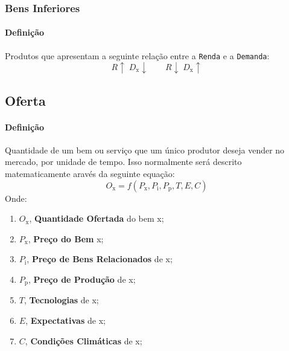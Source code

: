 \documentclass{article}
\begin{document}
        \subsubsection{Bens Inferiores}
            \paragraph{Definição}Produtos que apresentam a seguinte relação entre a \texttt{Renda} e a \texttt{Demanda}:
                \begin{equation}
                    \boxed{
                        R\uparrow
                        \;
                        D_{\text{x}}\downarrow
                    }
                    \qquad
                    \boxed{
                        R\downarrow
                        \;
                        D_{\text{x}}\uparrow
                    }
                \end{equation}

        \subsection{Oferta}
            \paragraph{Definição}Quantidade de um bem ou serviço que um único produtor deseja vender no mercado, por unidade de tempo. Isso normalmente será descrito matematicamente aravés da seguinte equação:
                \begin{equation}
                    \boxed{
                        O_{\text{x}} =
                        f(
                            P_{\text{x}},
                            P_{\text{i}},
                            P_{\text{p}},
                            T,
                            E,
                            C
                        )
                    }
                \end{equation}
            Onde:
                \begin{enumerate}[noitemsep]
                    \item $O_{\text{x}}$, \textbf{Quantidade Ofertada} do bem x;
                    \item $P_{\text{x}}$, \textbf{Preço do Bem} x;
                    \item $P_{\text{i}}$, \textbf{Preço de Bens Relacionados} de x;
                    \item $P_{\text{p}}$, \textbf{Preço de Produção} de x;
                    \item $T$, \textbf{Tecnologias} de x;
                    \item $E$, \textbf{Expectativas} de x;
                    \item $C$, \textbf{Condições Climáticas} de x;
                \end{enumerate}
\end{document}
